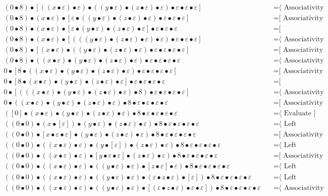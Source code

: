 \documentclass{article}
\begin{document}
\begin{align*}
(0 • 8) • [((x • ε) • ε) • ((y • ε) • (z • ε) • ε) • ε • ε • ε]
  & \quad \text{=⟨ Associativity ]}\\
(0 • 8) • (x • ε) • [ε • ((y • ε) • (z • ε) • ε) • ε • ε • ε]
  & \quad \text{=[ Associativity ⟩}\\
(0 • 8) • (x • ε) • [ε • (y • ε) • (z • ε) • ε] • ε • ε • ε
  & \quad \text{=[ Commutativity ⟩}\\
(0 • 8) • (x • ε) • [(((y • ε) • (z • ε) • ε) • ε) • ε • ε • ε]
  & \quad \text{=⟨ Associativity ]}\\
(0 • 8) • [(x • ε) • ((y • ε) • (z • ε) • ε) • ε • ε • ε • ε]
  & \quad \text{=[ Associativity ⟩}\\
(0 • 8) • ((x • ε) • (y • ε) • (z • ε) • ε) • ε • ε • ε • ε
  & \quad \text{=⟨ Associativity ]}\\
0 • [8 • ((x • ε) • (y • ε) • (z • ε) • ε) • ε • ε • ε • ε]
  & \quad \text{=[ Associativity ⟩}\\
0 • [8 • (x • ε) • (y • ε) • (z • ε) • ε] • ε • ε • ε • ε
  & \quad \text{=[ Commutativity ⟩}\\
0 • [(((x • ε) • (y • ε) • (z • ε) • ε) • 8) • ε • ε • ε • ε]
  & \quad \text{=⟨ Associativity ]}\\
0 • ((x • ε) • (y • ε) • (z • ε) • ε) • 8 • ε • ε • ε • ε
  & \quad \text{=[ Associativity ⟩}\\
([0] • (x • ε) • (y • ε) • (z • ε) • ε) • 8 • ε • ε • ε • ε
  & \quad \text{=⟨ Evaluate ]}\\
((0 • 0) • (x • [ε]) • (y • ε) • (z • ε) • ε) • 8 • ε • ε • ε • ε
  & \quad \text{=⟨ Left neutrality ]}\\
((0 • 0) • [x • ε • ε] • (y • ε) • (z • ε) • ε) • 8 • ε • ε • ε • ε
  & \quad \text{=[ Associativity ⟩}\\
((0 • 0) • ((x • ε) • ε) • (y • [ε]) • (z • ε) • ε) • 8 • ε • ε • ε • ε
  & \quad \text{=⟨ Left neutrality ]}\\
((0 • 0) • ((x • ε) • ε) • [y • ε • ε] • (z • ε) • ε) • 8 • ε • ε • ε • ε
  & \quad \text{=[ Associativity ⟩}\\
((0 • 0) • ((x • ε) • ε) • ((y • ε) • ε) • [z • ε] • ε) • 8 • ε • ε • ε • ε
  & \quad \text{=⟨ Left neutrality ]}\\
((0 • 0) • ((x • ε) • ε) • ((y • ε) • ε) • (ε • z • ε) • [ε]) • 8 • ε • ε • ε • ε
  & \quad \text{=⟨ Left neutrality ]}\\
((0 • 0) • ((x • ε) • ε) • ((y • ε) • ε) • [(ε • z • ε) • ε • ε]) • 8 • ε • ε • ε • ε
  & \quad \text{=⟨ Associativity ]}\\

\end{align*}
\end{document}
